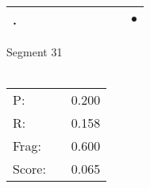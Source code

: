 \documentclass[landscape]{article}
\newcommand{\ssp}{\hspace{2pt}}
\newcommand{\mex}{\cellcolor{g}$\bullet$}
\begin{document}
\begin{tabular}{|l|p{10pt}|p{10pt}|p{10pt}|p{10pt}|p{10pt}|p{10pt}|p{10pt}|p{10pt}|p{10pt}|}
\hline
\ssp \cellcolor{ref8}. \ssp&\hspace{2pt}&\hspace{2pt}&\hspace{2pt}&\hspace{2pt}&\hspace{2pt}&\hspace{2pt}&\hspace{2pt}&\hspace{2pt}&\hspace{2pt}\mex\\
\hline
\end{tabular}

\vspace{6pt}
\noindent Segment 31\\\\
\noindent\begin{tabular}{lm{12pt}r}
\hline
P:&&0.200\\
R:&&0.158\\
Frag:&&0.600\\
Score:&&0.065\\
\end{tabular}

\newpage
\end{document}

